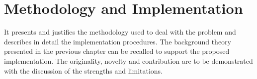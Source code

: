 \section{Methodology and Implementation}

	It presents and justifies the methodology used to deal with the problem and describes in detail the implementation procedures. The background theory presented in the previous chapter can be recalled to support the proposed implementation. The originality, novelty and contribution are to be demonstrated with the discussion of the strengths and limitations.